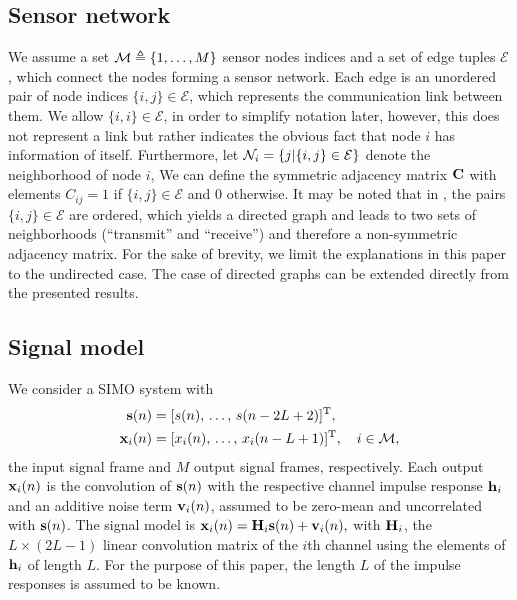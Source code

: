 \documentclass{article}
\begin{document}
\subsection[]{Sensor network}
We assume a set \(\mathcal{M} \triangleq \{1,\ldots,M\}\) sensor nodes indices and a set of edge tuples \(\mathcal{E}\), which connect the nodes forming a sensor network.
Each edge is an unordered pair of node indices \(\{i,j\} \in \mathcal{E}\), which represents the communication link between them.
We allow \(\{i,i\} \in \mathcal{E}\), in order to simplify notation later, however, this does not represent a link but rather indicates the obvious fact that node \(i\) has information of itself.
Furthermore, let \(\mathcal{N}_i = \{j|\{i,j\} \in \mathcal{E}\}\) denote the neighborhood of node \(i\),
We can define the symmetric adjacency matrix \(\bm{\mathrm{C}}\) with elements \(C_{ij} = 1\) if \(\{i,j\} \in \mathcal{E}\) and 0 otherwise.
It may be noted that in \cite{blochbergerDBSI}, the pairs \(\{i,j\} \in \mathcal{E}\) are ordered, which yields a directed graph and leads to two sets of neighborhoods (``transmit'' and ``receive'') and therefore a non-symmetric adjacency matrix.
For the sake of brevity, we limit the explanations in this paper to the undirected case.
The case of directed graphs can be extended directly from the presented results.

\subsection[]{Signal model}
We consider a SIMO system with
\begin{align}
    \bm{\mathrm{s}}(n) &= [s(n),\,\ldots,\,s(n-2L+2)]^{{\mathrm{T}}},\\
    \bm{\mathrm{x}}_i(n) &= [x_i(n),\,\ldots,\,x_i(n-L+1)]^{{\mathrm{T}}}, \quad i \in \mathcal{M},
\end{align}
the input signal frame and \(M\) output signal frames, respectively.
Each output \(\bm{\mathrm{x}}_i(n)\) is the convolution of \(\bm{\mathrm{s}}(n)\) with the respective channel impulse response \(\bm{\mathrm{h}}_i\) and an additive noise term \(\bm{\mathrm{v}}_i(n)\), assumed to be zero-mean and uncorrelated with \(\bm{\mathrm{s}}(n)\).
The signal model is \(\bm{\mathrm{x}}_i(n) = \bm{\mathrm{H}}_i \bm{\mathrm{s}}(n) + \bm{\mathrm{v}}_i(n),\)
with \(\bm{\mathrm{H}}_i\), the \(L \times (2L-1)\) linear convolution matrix of the \(i\)th channel using the elements of \(\bm{\mathrm{h}}_i\) of length \(L\).
For the purpose of this paper, the length \(L\) of the impulse responses is assumed to be known.
\end{document}
